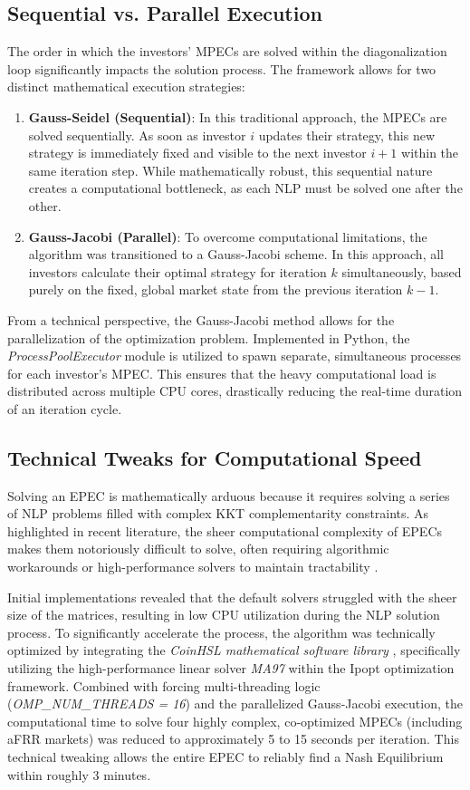 \subsection{Sequential vs. Parallel Execution} \label{subsect:Sequential_vs_Parallel}
The order in which the investors' MPECs are solved within the diagonalization loop significantly impacts the solution process. The framework allows for two distinct mathematical execution strategies:
\begin{enumerate}
    \item \textbf{Gauss-Seidel (Sequential)}: In this traditional approach, the MPECs are solved sequentially. As soon as investor \(i\) updates their strategy, this new strategy is immediately fixed and visible to the next investor \(i+1\) within the same iteration step. While mathematically robust, this sequential nature creates a computational bottleneck, as each NLP must be solved one after the other.
    \item \textbf{Gauss-Jacobi (Parallel)}: To overcome computational limitations, the algorithm was transitioned to a Gauss-Jacobi scheme. In this approach, all investors calculate their optimal strategy for iteration \(k\) simultaneously, based purely on the fixed, global market state from the previous iteration \(k-1\).
\end{enumerate}
From a technical perspective, the Gauss-Jacobi method allows for the parallelization of the optimization problem. Implemented in Python, the \textit{ProcessPoolExecutor} module is utilized to spawn separate, simultaneous processes for each investor's MPEC. This ensures that the heavy computational load is distributed across multiple CPU cores, drastically reducing the real-time duration of an iteration cycle.

\subsection{Technical Tweaks for Computational Speed} \label{subsect:Technical_Tweaks}
Solving an EPEC is mathematically arduous because it requires solving a series of NLP problems filled with complex KKT complementarity constraints. As highlighted in recent literature, the sheer computational complexity of EPECs makes them notoriously difficult to solve, often requiring algorithmic workarounds or high-performance solvers to maintain tractability \cite{devine_strategic_2023}.

Initial implementations revealed that the default solvers struggled with the sheer size of the matrices, resulting in low CPU utilization during the NLP solution process. To significantly accelerate the process, the algorithm was technically optimized by integrating the \textit{CoinHSL mathematical software library} \cite{hsl_collection}, specifically utilizing the high-performance linear solver \textit{MA97} within the Ipopt optimization framework. Combined with forcing multi-threading logic (\textit{OMP\_NUM\_THREADS = 16}) and the parallelized Gauss-Jacobi execution, the computational time to solve four highly complex, co-optimized MPECs (including aFRR markets) was reduced to approximately 5 to 15 seconds per iteration. This technical tweaking allows the entire EPEC to reliably find a Nash Equilibrium within roughly 3 minutes.

